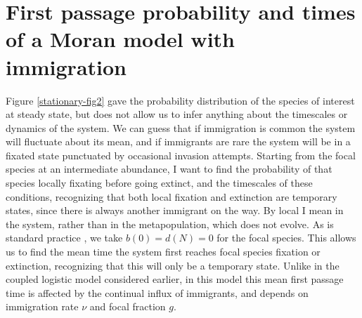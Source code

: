 \section{First passage probability and times of a Moran model with immigration}
Figure \ref{stationary-fig2} gave the probability distribution of the species of interest at steady state, but does not allow us to infer anything about the timescales or dynamics of the system. 
We can guess that if immigration is common the system will fluctuate about its mean, and if immigrants are rare the system will be in a fixated state punctuated by occasional invasion attempts. 
Starting from the focal species at an intermediate abundance, I want to find the probability of that species locally fixating before going extinct, and the timescales of these conditions, recognizing that both local fixation and extinction are temporary states, since there is always another immigrant on the way. 
By local I mean in the system, rather than in the metapopulation, which does not evolve. 
As is standard practice \cite{Nisbet1982,Iyer-Biswas2015}, we take $b(0)=d(N)=0$ for the focal species. 
This allows us to find the mean time the system first reaches focal species fixation or extinction, recognizing that this will only be a temporary state. 
Unlike in the coupled logistic model considered earlier, in this model this mean first passage time is affected by the continual influx of immigrants, and depends on immigration rate $\nu$ and focal fraction $g$. 

